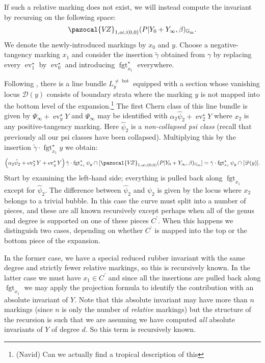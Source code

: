 \documentclass[11pt]{amsart}
\newcommand{\VZ}{\pazocal{V\!Z}}
\newcommand{\st}{\star}
\newcommand{\Gm}{\mathbb{G}_{\text{m}}}
\newcommand{\ev}{\operatorname{ev}}
\newcommand{\fgt}{\operatorname{fgt}}
\newcommand{\Dcal}{\mathcal{D}}
\theoremstyle{definition}
\theoremstyle{definition}
\begin{document}
If such a relative marking does not exist, we will instead compute the invariant by recursing on the following space:
\begin{equation*} \VZ_{1,\alpha \cup (0,0)}(P|Y_0+Y_\infty,\beta)_{\Gm}. \end{equation*}
We denote the newly-introduced markings by $x_0$ and $y$. Choose a negative-tangency marking $x_1$ and consider the insertion $\tilde\gamma$ obtained from $\gamma$ by replacing every $\ev_1^\st$ by $\ev_0^\st$ and introducing $\fgt_{x_1}^\st$ everywhere.

Following \cite{EKatz}, there is a line bundle $L_{y}^{\neq\operatorname{bot}}$ equipped with a section whose vanishing locus $\Dcal(y)$ consists of boundary strata where the marking $y$ is not mapped into the bottom level of the expansion.\footnote{(Navid) Can we actually find a tropical description of this} The first Chern class of this line bundle is given by $\Psi_\infty + \ev_y^\st Y$ and $\Psi_\infty$ may be identified with $\alpha_2 \hat\psi_2 + \ev_2^\st Y$ where $x_2$ is any positive-tangency marking. Here $\hat\psi_2$ is a \emph{non-collapsed psi class} (recall that previously all our psi classes have been collapsed). Multiplying this by the insertion $\tilde\gamma \cdot \fgt_{x_1}^\st y$ we obtain:
\begin{equation}\label{step 4 recursion} \left( \alpha_2 \hat\psi_2 + \ev_2^\st Y + \ev_y^\st Y \right) \tilde\gamma \cdot \fgt_{x_1}^\st \psi_y \cap [\VZ_{1,\alpha \cup (0,0)}(P|Y_0+Y_\infty,\beta)_{\Gm}] = \tilde\gamma \cdot \fgt_{x_1}^\st \psi_y \cap [\Dcal(y)].\end{equation}
Start by examining the left-hand side; everything is pulled back along $\fgt_{x_1}$ except for $\hat\psi_2$. The difference between $\hat\psi_2$ and $\psi_2$ is given by the locus where $x_2$ belongs to a trivial bubble. In this case the curve must split into a number of pieces, and these are all known recursively except perhaps when all of the genus and degree is supported on one of these pieces $C^\prime$. When this happens we distinguish two cases, depending on whether $C^\prime$ is mapped into the top or the bottom piece of the expansion.

In the former case, we have a special reduced rubber invariant with the same degree and strictly fewer relative markings, so this is recursively known. In the latter case we must have $x_1 \in C^\prime$ and since all the insertions are pulled back along $\fgt_{x_1}$ we may apply the projection formula to identify the contribution with an absolute invariant of $Y$. Note that this absolute invariant may have more than $n$ markings (since $n$ is only the number of \emph{relative} markings) but the structure of the recursion is such that we are assuming we have computed \emph{all} absolute invariants of $Y$ of degree $d$. So this term is recursively known.
\end{document}
